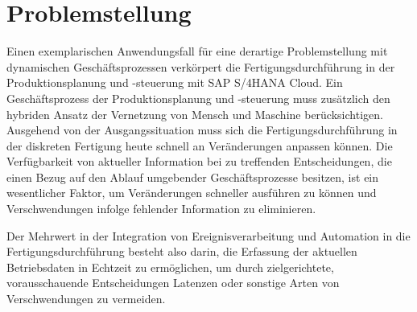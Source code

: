 \section{Problemstellung}\label{sec:Problemstellung}
Einen exemplarischen Anwendungsfall für eine derartige Problemstellung mit dynamischen Geschäftsprozessen verkörpert die Fertigungsdurchführung in der Produktionsplanung und -steuerung mit SAP S/4HANA Cloud. Ein Geschäftsprozess der Produktionsplanung und -steuerung muss zusätzlich den hybriden Ansatz der Vernetzung von Mensch und Maschine berücksichtigen.
\cite{Schell.2017}
Ausgehend von der Ausgangssituation muss sich die Fertigungsdurchführung in der diskreten Fertigung heute schnell an Veränderungen anpassen können. Die Verfügbarkeit von aktueller Information bei zu treffenden Entscheidungen, die einen Bezug auf den Ablauf umgebender Geschäftsprozesse besitzen, ist ein wesentlicher Faktor, um Veränderungen schneller ausführen zu können und Verschwendungen infolge fehlender Information zu eliminieren.
\cite{Westkamper.2006}

Der Mehrwert in der Integration von Ereignisverarbeitung und Automation in die Fertigungsdurchführung besteht also darin, die Erfassung der aktuellen Betriebsdaten in Echtzeit zu ermöglichen, um durch zielgerichtete, vorausschauende Entscheidungen Latenzen oder sonstige Arten von Verschwendungen zu vermeiden.  


